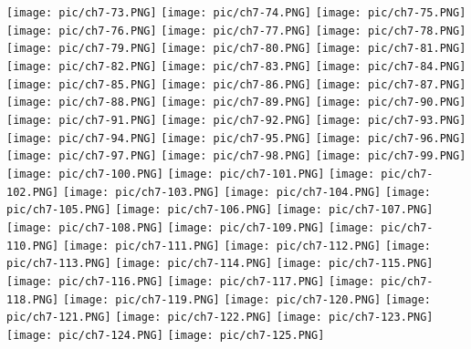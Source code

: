 \documentclass[UTF-8]{ctexart}
\begin{document}
\begin{center}
    \texttt{[image: pic/ch7-73.PNG]}
    \texttt{[image: pic/ch7-74.PNG]}
    \texttt{[image: pic/ch7-75.PNG]}
    \texttt{[image: pic/ch7-76.PNG]}
    \texttt{[image: pic/ch7-77.PNG]}
    \texttt{[image: pic/ch7-78.PNG]}
    \texttt{[image: pic/ch7-79.PNG]}
    \texttt{[image: pic/ch7-80.PNG]}
    \texttt{[image: pic/ch7-81.PNG]}
    \texttt{[image: pic/ch7-82.PNG]}
    \texttt{[image: pic/ch7-83.PNG]}
    \texttt{[image: pic/ch7-84.PNG]}
    \texttt{[image: pic/ch7-85.PNG]}
    \texttt{[image: pic/ch7-86.PNG]}
    \texttt{[image: pic/ch7-87.PNG]}
    \texttt{[image: pic/ch7-88.PNG]}
    \texttt{[image: pic/ch7-89.PNG]}
    \texttt{[image: pic/ch7-90.PNG]}
    \texttt{[image: pic/ch7-91.PNG]}
    \texttt{[image: pic/ch7-92.PNG]}
    \texttt{[image: pic/ch7-93.PNG]}
    \texttt{[image: pic/ch7-94.PNG]}
    \texttt{[image: pic/ch7-95.PNG]}
    \newpage
    \texttt{[image: pic/ch7-96.PNG]}
    \texttt{[image: pic/ch7-97.PNG]}
    \texttt{[image: pic/ch7-98.PNG]}
    \texttt{[image: pic/ch7-99.PNG]}
    \texttt{[image: pic/ch7-100.PNG]}
    \texttt{[image: pic/ch7-101.PNG]}
    \texttt{[image: pic/ch7-102.PNG]}
    \texttt{[image: pic/ch7-103.PNG]}
    \texttt{[image: pic/ch7-104.PNG]}
    \texttt{[image: pic/ch7-105.PNG]}
    \texttt{[image: pic/ch7-106.PNG]}
    \texttt{[image: pic/ch7-107.PNG]}
    \texttt{[image: pic/ch7-108.PNG]}
    \texttt{[image: pic/ch7-109.PNG]}
    \texttt{[image: pic/ch7-110.PNG]}
    \texttt{[image: pic/ch7-111.PNG]}
    \texttt{[image: pic/ch7-112.PNG]}
    \texttt{[image: pic/ch7-113.PNG]}
    \texttt{[image: pic/ch7-114.PNG]}
    \texttt{[image: pic/ch7-115.PNG]}
    \texttt{[image: pic/ch7-116.PNG]}
    \texttt{[image: pic/ch7-117.PNG]}
    \texttt{[image: pic/ch7-118.PNG]}
    \texttt{[image: pic/ch7-119.PNG]}
    \texttt{[image: pic/ch7-120.PNG]}
    \texttt{[image: pic/ch7-121.PNG]}
    \texttt{[image: pic/ch7-122.PNG]}
    \texttt{[image: pic/ch7-123.PNG]}
    \texttt{[image: pic/ch7-124.PNG]}
    \texttt{[image: pic/ch7-125.PNG]}

\end{center}
\end{document}
